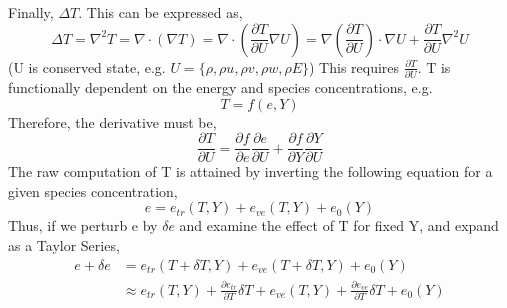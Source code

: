 \documentclass[10pt]{article}
\newcommand{\myred}[1]{{\color{red} #1}}
\begin{document}
Finally, $\Delta{}T$. This can be expressed as, 
\begin{equation}
\Delta T = \nabla^2 T = \nabla \cdot (\nabla T) = \nabla \cdot
 (\frac{\partial T}{\partial U} \nabla U) =  \nabla (\frac{\partial
 T}{\partial U} )\cdot \nabla U + \frac{\partial T}{\partial U} \nabla^2 U  
\end{equation}
(U is conserved state, e.g. $U=\{\rho,\rho u,\rho v, \rho w, \rho E
\}$) This requires $\frac{\partial T}{\partial U}$. T is functionally
dependent on the energy and species concentrations, e.g.
\begin{equation}
 T = f(e,Y)
\end{equation}
Therefore, the derivative must be,
\begin{equation}
 \frac{\partial T}{\partial U} = \frac{\partial f}{\partial
  e}\frac{\partial e}{\partial U} + \frac{\partial f}{\partial
  Y}\frac{\partial Y}{\partial U}
\end{equation}
The raw computation of T is attained by inverting the following equation
for a given species concentration,
\begin{equation}
e = e_{tr}(T,Y) + e_{ve}(T,Y) + e_{0}(Y)
\end{equation}
Thus, if we perturb e by $\delta e$ and examine the effect of T for
fixed Y, and expand as a Taylor Series,
\begin{align}
e + \delta e &= e_{tr}(T + \delta T,Y) + e_{ve}(T+\delta T,Y) + e_{0}(Y) \\
 &\approx e_{tr}(T,Y) + \frac{\partial e_{tr}}{\partial T} \delta T +
 e_{ve}(T,Y)+ \frac{\partial e_{ve}}{\partial T} \delta T + e_{0}(Y)
\end{align}

\end{document}
